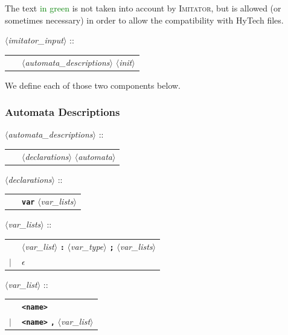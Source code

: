 \documentclass[a4paper,11pt]{article}
\newcommand{\emptystring}{$\epsilon$}
\newcommand{\hytech}{{\sc HyTech}}
\newcommand{\imitator}{\textsc{Imitator}}
\newcommand{\nt}[1]{$\langle$\emph{#1}$\rangle$}
\newcommand{\regleGrammaire}[1]{\bigskip \noindent \nt{#1} :: \\}
\newcommand{\npec}[1]{\textcolor{green}{#1}}
\newcommand{\code}[1]{\textbf{\texttt{#1}}}
\begin{document}
The text \npec{in green} is not taken into account by \imitator{}, but is allowed (or sometimes necessary) in order to allow the compatibility with \hytech{} files.


\regleGrammaire{imitator\_input}
\begin{tabular}{l l}
	\  & \nt{automata\_descriptions} \nt{init} \\
\end{tabular}

\medskip


We define each of those two components below.

\subsubsection{Automata Descriptions}

\regleGrammaire{automata\_descriptions}
\begin{tabular}{l l}
	\  & \nt{declarations} \nt{automata} \\
\end{tabular}

\regleGrammaire{declarations}
\begin{tabular}{l l}
	\  & \code{var} \nt{var\_lists} \\
\end{tabular}

\regleGrammaire{var\_lists}
\begin{tabular}{l l}
	\  & \nt{var\_list} \code{:} \nt{var\_type} \code{;} \nt{var\_lists} \\
	$|$ & \emptystring
\end{tabular}

\regleGrammaire{var\_list}
\begin{tabular}{l l}
	\  & \code{<name>} \\
	$|$ & \code{<name>} \code{,} \nt{var\_list}
\end{tabular}
\end{document}

